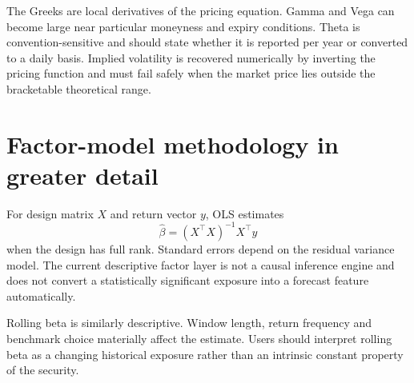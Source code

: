 \documentclass[11pt]{article}
\begin{document}
The Greeks are local derivatives of the pricing equation. Gamma and Vega can become large near particular moneyness and expiry conditions. Theta is convention-sensitive and should state whether it is reported per year or converted to a daily basis. Implied volatility is recovered numerically by inverting the pricing function and must fail safely when the market price lies outside the bracketable theoretical range.

\section{Factor-model methodology in greater detail}
For design matrix $X$ and return vector $y$, OLS estimates
\begin{equation}
\hat\beta=(X^\top X)^{-1}X^\top y
\end{equation}
when the design has full rank. Standard errors depend on the residual variance model. The current descriptive factor layer is not a causal inference engine and does not convert a statistically significant exposure into a forecast feature automatically.

Rolling beta is similarly descriptive. Window length, return frequency and benchmark choice materially affect the estimate. Users should interpret rolling beta as a changing historical exposure rather than an intrinsic constant property of the security.
\end{document}
